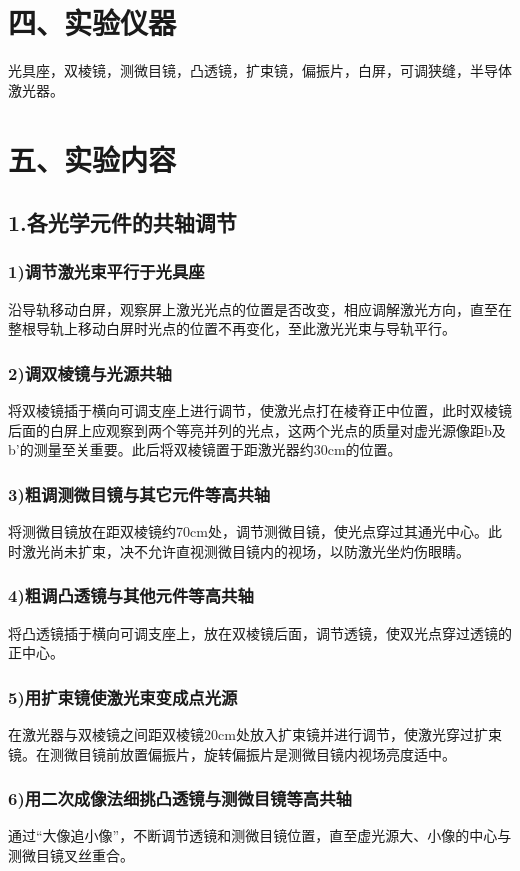 \documentclass[11pt,a4paper,oneside]{article}
\begin{document}
\section*{四、实验仪器}
   光具座，双棱镜，测微目镜，凸透镜，扩束镜，偏振片，白屏，可调狭缝，半导体激光器。
   
\section*{五、实验内容}

\subsection*{1.各光学元件的共轴调节}
\subsubsection*{1)调节激光束平行于光具座}
沿导轨移动白屏，观察屏上激光光点的位置是否改变，相应调解激光方向，直至在整根导轨上移动白屏时光点的位置不再变化，至此激光光束与导轨平行。
\subsubsection*{2)调双棱镜与光源共轴}
将双棱镜插于横向可调支座上进行调节，使激光点打在棱脊正中位置，此时双棱镜后面的白屏上应观察到两个等亮并列的光点，这两个光点的质量对虚光源像距b及b’的测量至关重要。此后将双棱镜置于距激光器约30cm的位置。
\subsubsection*{3)粗调测微目镜与其它元件等高共轴}
将测微目镜放在距双棱镜约70cm处，调节测微目镜，使光点穿过其通光中心。此时激光尚未扩束，决不允许直视测微目镜内的视场，以防激光坐灼伤眼睛。
\subsubsection*{4)粗调凸透镜与其他元件等高共轴}
将凸透镜插于横向可调支座上，放在双棱镜后面，调节透镜，使双光点穿过透镜的正中心。
\subsubsection*{5)用扩束镜使激光束变成点光源}
在激光器与双棱镜之间距双棱镜20cm处放入扩束镜并进行调节，使激光穿过扩束镜。在测微目镜前放置偏振片，旋转偏振片是测微目镜内视场亮度适中。
\subsubsection*{6)用二次成像法细挑凸透镜与测微目镜等高共轴}
通过“大像追小像”，不断调节透镜和测微目镜位置，直至虚光源大、小像的中心与测微目镜叉丝重合。
\end{document}
